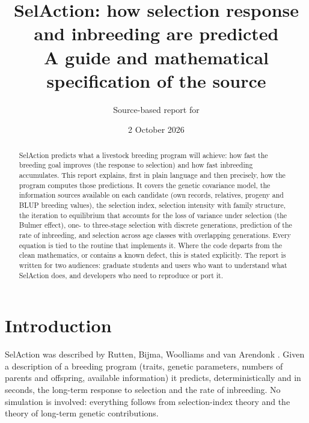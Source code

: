 \documentclass[11pt]{article}
\title{SelAction: how selection response and inbreeding are predicted\\[4pt]
\large A guide and mathematical specification of the \src{fortran/} source}
\author{Source-based report for \src{fortran/}}
\date{2 October 2026}
\begin{document}
\maketitle
\begin{abstract}
SelAction predicts what a livestock breeding program will achieve: how fast the breeding goal improves (the response to selection) and how fast inbreeding accumulates. This report explains, first in plain language and then precisely, how the program computes those predictions. It covers the genetic covariance model, the information sources available on each candidate (own records, relatives, progeny and BLUP breeding values), the selection index, selection intensity with family structure, the iteration to equilibrium that accounts for the loss of variance under selection (the Bulmer effect), one- to three-stage selection with discrete generations, prediction of the rate of inbreeding, and selection across age classes with overlapping generations. Every equation is tied to the routine that implements it. Where the code departs from the clean mathematics, or contains a known defect, this is stated explicitly. The report is written for two audiences: graduate students and users who want to understand what SelAction does, and developers who need to reproduce or port it.
\end{abstract}
\tableofcontents

\section{Introduction}\label{sec:intro}
SelAction was described by Rutten, Bijma, Woolliams and van Arendonk \cite{rutten2002}. Given a description of a breeding program (traits, genetic parameters, numbers of parents and offspring, available information) it predicts, deterministically and in seconds, the long-term response to selection and the rate of inbreeding. No simulation is involved: everything follows from selection-index theory and the theory of long-term genetic contributions.
\end{document}
